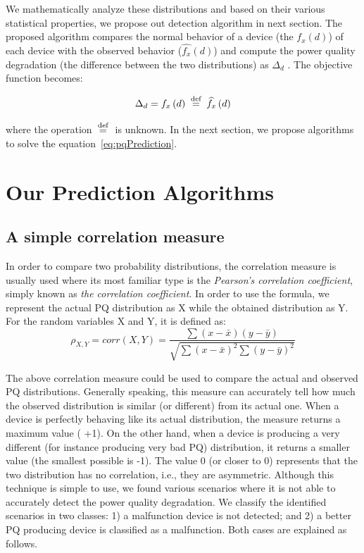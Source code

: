 \documentclass[12pt,oneside]{book}
\newcommand{\defeq}{\buildrel {\text{ def }}\over =}
\begin{document}
We mathematically analyze these distributions and based on their various statistical properties, we propose out detection algorithm in next section. The proposed algorithm compares the normal behavior of a device (the $f_x\left(d\right)$) of each device with the observed behavior ($\widehat {f_x}\left(d\right)$) and compute the power quality degradation (the difference between the two distributions) as $\Delta_d$ . The objective function becomes:

\begin{equation}
\label{eq:pqPrediction}
\Delta_d = f_x\left(d\right) \defeq \widehat{f_x}\left(d\right)
\end{equation}

\noindent where the operation $\defeq$ is unknown. In the next section,  we propose algorithms to solve the equation~\ref{eq:pqPrediction}.

\section{Our Prediction Algorithms}
\subsection{A simple correlation measure}
In order to compare two probability distributions, the correlation measure is usually used where its most familiar type is the \textit{Pearson's correlation coefficient}, simply known as \textit{the correlation coefficient}. In order to use the formula, we represent the actual PQ distribution as X while the obtained distribution as Y. For the random variables X and Y, it is defined as:
\[\rho_{X,Y} = corr(X,Y) = \frac{\sum (x-\bar x) (y-\bar y)}{\sqrt{\sum (x-\bar x)^2 \sum (y-\bar y)^2}}\]

The above correlation measure could be used to compare the actual and observed PQ distributions. Generally speaking, this measure can accurately tell how much the observed distribution is similar (or different) from its actual one. When a device is perfectly behaving like its actual distribution, the measure returns a maximum value (  +1). On the other hand, when a device is producing a very different (for instance producing very bad PQ) distribution, it returns a smaller value (the smallest possible is -1). The value 0 (or closer to 0) represents that the two distribution has no correlation, i.e., they are asymmetric. Although this technique is simple to use, we found various scenarios where it is not able to accurately detect the power quality degradation. We classify the identified scenarios in two classes: 1) a malfunction device is not detected; and 2) a better PQ producing device is classified as a malfunction. Both cases are explained as follows.
\end{document}
